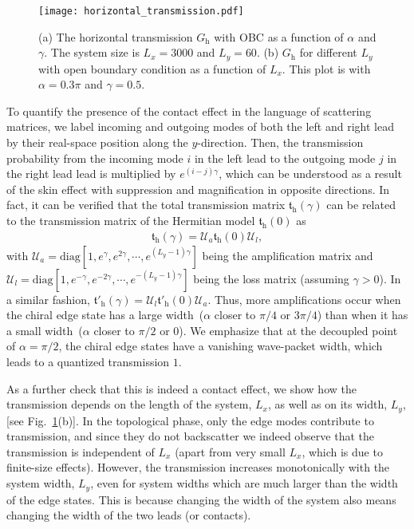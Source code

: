 \documentclass[aps,pra,reprint,superscriptaddress,showkeys,amsmath,amssymb,longbibliography]{revtex4-1}
\begin{document}
\begin{figure}
\centering
\texttt{[image: horizontal\_transmission.pdf]}
\caption{(a) The horizontal transmission $G_{\text{h}}$ with OBC as a function of $\alpha$ and $\gamma$. 
The system size is $L_x=3000$ and $L_y=60$. (b) $G_{\text{h}}$ for different $L_y$ with open boundary condition as a function of $L_x$. 
This plot is with $\alpha = 0.3\pi$ and $\gamma=0.5$.
\label{fig: horizontal_transmission}}
\end{figure}

To quantify the presence of the contact effect in the language of scattering matrices, we label incoming and outgoing modes of both the left and right lead by their real-space position along the $y$-direction.
Then, the transmission probability from the incoming mode $i$ in the left lead to the outgoing mode $j$ in the right lead lead is multiplied by $e^{(i-j)\gamma}$, which can be understood as a result of the skin effect with suppression and magnification in opposite directions.
In fact, it can be verified that the total transmission matrix $\mathfrak{t}_{\text{h}}(\gamma)$ can be related to the transmission matrix of the Hermitian model $\mathfrak{t}_{\text{h}}(0)$ as
\begin{eqnarray}
\mathfrak{t}_{\text{h}}(\gamma)=\mathcal{U}_a\mathfrak{t}_{\text{h}}(0)\mathcal{U}_l,\label{eq:cont}
\end{eqnarray}
with $\mathcal{U}_a=\text{diag}[1, e^{\gamma},e^{2\gamma},\cdots,e^{(L_y-1)\gamma}]$ being the amplification matrix and $\mathcal{U}_l=\text{diag}[1, e^{-\gamma},e^{-2\gamma},\cdots,e^{-(L_y-1)\gamma}]$ being the loss matrix (assuming $\gamma >0$).
In a similar fashion, $\mathfrak{t}'_{\text{h}}(\gamma)=\mathcal{U}_l\mathfrak{t}'_{\text{h}}(0)\mathcal{U}_a$.
Thus, more amplifications occur when the chiral edge state has a large width~($\alpha$ closer to $\pi/4$ or $3\pi/4$) than when it has a small width~($\alpha$ closer to $\pi/2$ or $0$).
We emphasize that at the decoupled point of $\alpha=\pi/2$, the chiral edge states have a vanishing wave-packet width, which leads to a quantized transmission $1$.

As a further check that this is indeed a contact effect, we show how the transmission depends on the length of the system, $L_x$, as well as on its width, $L_y$, [see Fig.~\ref{fig: horizontal_transmission}(b)]. 
In the topological phase, only the edge modes contribute to transmission, and since they do not backscatter we indeed observe that the transmission is independent of $L_x$ (apart from very small $L_x$, which is due to finite-size effects).
However, the transmission increases monotonically with the system width, $L_y$, even for system widths which are much larger than the width of the edge states.
This is because changing the width of the system also means changing the width of the two leads (or contacts).
\end{document}
